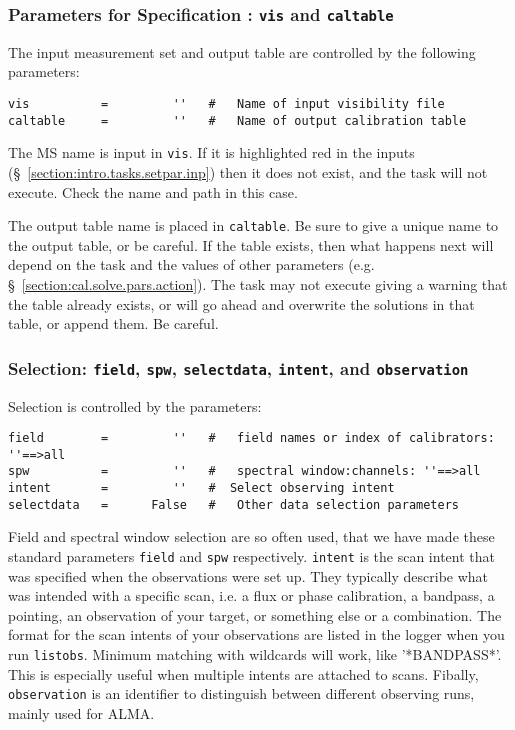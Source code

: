 \subsubsection{Parameters for Specification : {\tt vis} and
{\tt caltable} }
\label{section:cal.solve.pars.spec}

The input measurement set and output table are
controlled by the following parameters:
\small
\begin{verbatim}
vis          =         ''   #   Name of input visibility file
caltable     =         ''   #   Name of output calibration table
\end{verbatim}
\normalsize

The MS name is input in {\tt vis}.  If it is highlighted red
in the inputs (\S~\ref{section:intro.tasks.setpar.inp}) then it 
does not exist, and the task will not execute.  Check the name and
path in this case. 

The output table name is placed in {\tt caltable}.  Be sure to give a
unique name to the output table, or be careful.  If the table exists,
then what happens next will depend on the task and the values of other
parameters (e.g.  \S~\ref{section:cal.solve.pars.action}).  The task
may not execute giving a warning that the table already exists, or
will go ahead and overwrite the solutions in that table, or append
them.  Be careful.

\subsubsection{Selection: {\tt field}, {\tt spw}, {\tt selectdata},
  {\tt intent}, and {\tt observation} }
\label{section:cal.solve.pars.select}

Selection is controlled by the parameters:
\small
\begin{verbatim}
field        =         ''   #   field names or index of calibrators: ''==>all
spw          =         ''   #   spectral window:channels: ''==>all 
intent       =         ''   #  Select observing intent
selectdata   =      False   #   Other data selection parameters
\end{verbatim}
\normalsize

Field and spectral window selection are so often used, that we have
made these standard parameters {\tt field} and {\tt spw}
respectively. {\tt intent} is the scan intent that was specified when
the observations were set up. They typically describe what was
intended with a specific scan, i.e. a flux or phase calibration, a
bandpass, a pointing, an observation of your target, or something else
or a combination. The format for the scan intents of your observations
are listed in the logger when you run {\tt listobs}. Minimum matching
with wildcards will work, like '*BANDPASS*'. This is especially useful
when multiple intents are attached to scans.  Fibally, {\tt
  observation} is an identifier to distinguish between different
observing runs, mainly used for ALMA.


